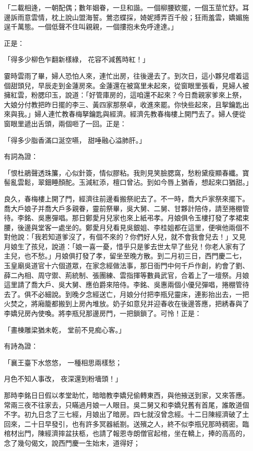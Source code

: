 \begin{showcontents}{}
「二載相逄，一朝配偶；數年姻眷，一旦和諧。一個柳腰欵擺，一個玉莖忙舒。耳邊訴雨意雲情，枕上說山盟海誓。鶯恣蝶採，婍妮搏弄百千般；狂雨羞雲，嬌媚施逞千萬態。一個低聲不住叫親親，一個摟抱未免呼達達。」

正是：

「得多少柳色乍翻新樣綠，  花容不減舊時紅！」

霎時雲雨了畢，婦人恐怕人來，連忙出房，往後邊去了。到次日，這小夥兒嚐着這個甜頭兒，早辰走到金蓮房來。金蓮還在被窩里未起來，從窗眼里張看，見婦人被擁紅雲，粉腮印玉，說道：「好管庫房的，這咱還不起來？今日喬親家爹來上祭，大娘分付教把昨日擺的李三、黃四家那祭卓，收進來罷。你快些起來，且挐鑰匙出來與我。」婦人連忙教春梅拏鑰匙與經濟。經濟先教春梅樓上開門去了。婦人便從窗眼里遞出舌頭，兩個咂了一回。正是：

「得多少脂香滿口涎空嚥，  甜唾融心溢肺肝。」

有詞為證：

「恨杜鵑聲透珠簾，心似針簽，情似膠粘。我則見笑臉腮窩，愁粉黛瘦顯春纖。寶髻亂雲鬆，翠鈿睡顏酡。玉減紅添，檀口曾沾。到如今唇上猶香，想起來口猶甜。」

良久，春梅樓上開了門，經濟往前邊看搬祭祀去了。不一時，喬大戶家祭來擺下。喬大戶娘子并喬大戶多親眷，靈前祭畢，吳大舅、二舅、甘夥計陪侍，請至捲棚管待。李銘、吳惠彈唱。那日鄭愛月兒家也來上紙弔孝。月娘俱令玉樓打發了孝裙束腰，後邊與堂客一處坐的。鄭愛月兒看見吳銀姐、李桂姐都在這里，便嗔他兩個不對他說：「我若知道爹沒了，有個不來的？你們好人兒，就不會我會兒去！」又見月娘生了孩兒，說道：「娘一喜一憂，惜乎只是爹去世太早了些兒！你老人家有了主兒，也不愁。」月娘俱打發了孝，留坐至晚方散。到二月初三日，西門慶二七，玉皇廟吳道官十六個道眾，在家念經做法事，那日衙門中何千戶作創，約會了劉、薛二內相、周守禦、荊統制、張團練、雲指揮等數員武官，合着上了一壇祭。月娘這里請了喬大戶、吳大舅、應伯爵來陪侍。李銘、吳惠兩個小優兒彈唱，捲棚管待去了。俱不必細說。到晚夕念經送亡，月娘分付把李瓶兒靈床，連影抬出去，一把火焚之，將廂籠都搬到上房內堆放。奶子如意兒并迎春收在後邊答應，把綉春與了李嬌兒房內使喚。將李瓶兒那邊房門，一把鎖鎖了。可怜！正是：

「畫棟雕梁猶未乾，  堂前不見痴心客。」

有詩為證：

「襄王臺下水悠悠，  一種相思兩樣愁；

月色不知人事改，  夜深還到粉墻頭！」

那時李銘日日假以孝堂助忙，暗暗教李嬌兒偷轉東西，與他掖送到家，又來答應。常兩三夜不往家去，只瞞過月娘一人眼目。吳二舅又和李嬌兒舊有首尾，誰敢道個不字。初九日念了三七經，月娘出了暗房。四七就沒曾念經。十二日陳經濟破了土回來，二十日早發引，也有許多冥器紙劄。送殯之人，終不似李瓶兒那時稠密。臨棺材出門，陳經濟摔盆扶柩，也請了報恩寺朗僧官起棺，坐在轎上，捧的高高的，念了幾句偈文，說西門慶一生始末，道得好；


\end{showcontents}
